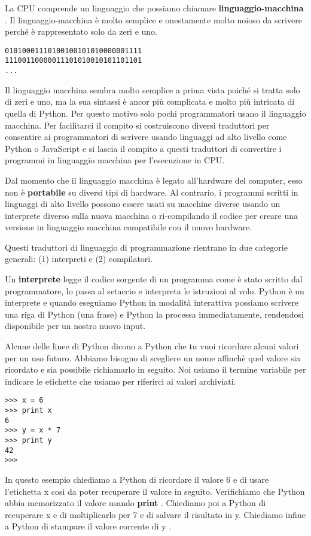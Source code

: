 La CPU comprende un linguaggio che possiamo chiamare \textbf{linguaggio-macchina} . Il linguaggio-macchina \`{e} molto semplice e onestamente molto noioso da scrivere perch\'{e} \`{e} rappresentato solo da zeri e uno.

\beforeverb
\begin{verbatim}
01010001110100100101010000001111
11100110000011101010010101101101
...
\end{verbatim}
\afterverb
%
Il linguaggio macchina sembra molto semplice a prima vista poich\'{e} si tratta solo di zeri e uno, ma la sua sintassi \`{e} ancor pi\`{u} complicata e molto pi\`{u} intricata di quella di Python. Per questo motivo solo pochi programmatori usano il linguaggio macchina. Per facilitarci il compito si costruiscono diversi traduttori per consentire ai programmatori di scrivere usando linguaggi ad alto livello come Python o JavaScript e si lascia il compito a questi traduttori di convertire i programmi in linguaggio macchina per l'esecuzione in CPU.


Dal momento che il linguaggio macchina \`{e} legato all'hardware del computer, esso non \`{e} \textbf{portabile }su diversi tipi di hardware. Al contrario, i programmi scritti in linguaggi di alto livello possono essere usati su macchine diverse usando un interprete diverso sulla nuova macchina o ri-compilando il codice per creare una versione in linguaggio macchina compatibile con il nuovo hardware.


Questi traduttori di linguaggio di programmazione rientrano in due categorie generali: (1) interpreti e (2) compilatori.

Un \textbf{interprete }legge il codice sorgente di un programma come \`{e} stato scritto dal programmatore, lo passa al setaccio e interpreta le istruzioni al volo. Python \`{e} un interprete e quando eseguiamo Python in modalit\`{a} interattiva possiamo scrivere una riga di Python (una frase) e Python la processa immediatamente, rendendosi disponibile per un nostro nuovo input.


Alcune delle linee di Python dicono a Python che tu vuoi ricordare alcuni valori per un uso futuro. Abbiamo bisogno di scegliere un nome affinch\`{e} quel valore sia ricordato e sia possibile richiamarlo in seguito. Noi usiamo il termine variabile per indicare le etichette che usiamo per riferirci ai valori archiviati.

\beforeverb
\begin{verbatim}
>>> x = 6
>>> print x
6
>>> y = x * 7
>>> print y
42
>>> 
\end{verbatim}
\afterverb
%
In questo esempio chiediamo a Python di ricordare il valore 6 e di usare l'etichetta x cos\`{i} da poter recuperare il valore in seguito. Verifichiamo che Python abbia memorizzato il valore usando \textbf{print }. Chiediamo poi a Python di recuperare x e di moltiplicarlo per 7 e di salvare il risultato in y. Chiediamo infine a Python di stampare il valore corrente di y .


